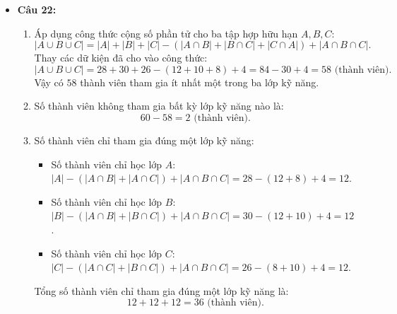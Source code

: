 \documentclass[12pt,a4paper]{article}
\begin{document}
\begin{itemize}[leftmargin=0.6cm, itemsep=2.5pt]
    \item \textbf{Câu 22:}
    \begin{enumerate}
        \item Áp dụng công thức cộng số phần tử cho ba tập hợp hữu hạn $A, B, C$:
        \[
        |A \cup B \cup C| = |A| + |B| + |C| - (|A \cap B| + |B \cap C| + |C \cap A|) + |A \cap B \cap C|.
        \]
        Thay các dữ kiện đã cho vào công thức:
        \[
        |A \cup B \cup C| = 28 + 30 + 26 - (12 + 10 + 8) + 4 = 84 - 30 + 4 = 58\text{ (thành viên)}.
        \]
        Vậy có $58$ thành viên tham gia ít nhất một trong ba lớp kỹ năng.
        \item Số thành viên không tham gia bất kỳ lớp kỹ năng nào là:
        \[
        60 - 58 = 2\text{ (thành viên)}.
        \]
        \item Số thành viên chỉ tham gia đúng một lớp kỹ năng:
        \begin{itemize}
            \item Số thành viên chỉ học lớp $A$: $|A| - (|A \cap B| + |A \cap C|) + |A \cap B \cap C| = 28 - (12 + 8) + 4 = 12$.
            \item Số thành viên chỉ học lớp $B$: $|B| - (|A \cap B| + |B \cap C|) + |A \cap B \cap C| = 30 - (12 + 10) + 4 = 12$.
            \item Số thành viên chỉ học lớp $C$: $|C| - (|A \cap C| + |B \cap C|) + |A \cap B \cap C| = 26 - (8 + 10) + 4 = 12$.
        \end{itemize}
        Tổng số thành viên chỉ tham gia đúng một lớp kỹ năng là:
        \[
        12 + 12 + 12 = 36\text{ (thành viên)}.
        \]
    \end{enumerate}
\end{itemize}
\end{document}
